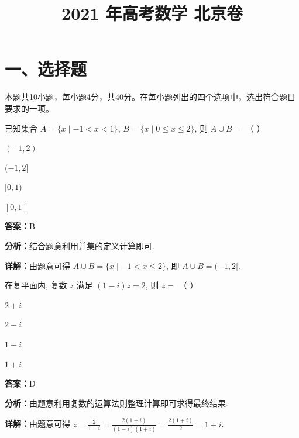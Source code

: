 ﻿\title{2021 年高考数学 北京卷}
\date{}
\maketitle

\section*{一、选择题}
本题共10小题，每小题4分，共40分。在每小题列出的四个选项中，选出符合题目要求的一项。

\begin{question}[points=4]
已知集合 $A=\{x\mid -1<x<1\}$, $B=\{x\mid 0\leq x\leq 2\}$, 则 $A\cup B=$ （ ）
\begin{choices}
  \item $(-1,2)$
  \item $(-1,2]$
  \item $[0,1)$
  \item $[0,1]$
\end{choices}
\begin{solution}
\textbf{答案：}B

\textbf{分析：}结合题意利用并集的定义计算即可.

\textbf{详解：}由题意可得 $A\cup B=\{x\mid -1<x\leq 2\}$, 即 $A\cup B=(-1,2]$.
\end{solution}
\end{question}

\begin{question}[points=4]
在复平面内, 复数 $z$ 满足 $(1-i)z=2$, 则 $z=$ （ ）
\begin{choices}
  \item $2+i$
  \item $2-i$
  \item $1-i$
  \item $1+i$
\end{choices}
\begin{solution}
\textbf{答案：}D

\textbf{分析：}由题意利用复数的运算法则整理计算即可求得最终结果.

\textbf{详解：}由题意可得 $z=\frac{2}{1-i}=\frac{2(1+i)}{(1-i)(1+i)}=\frac{2(1+i)}{2}=1+i$.
\end{solution}
\end{question}

